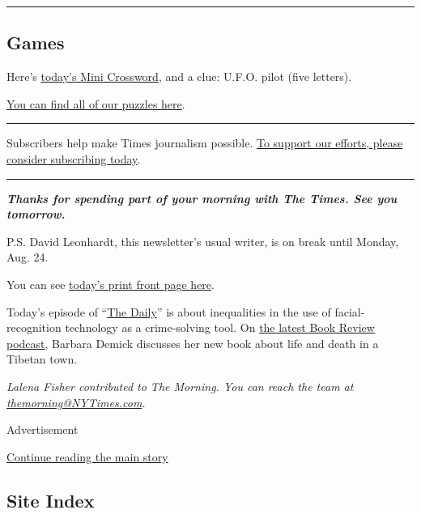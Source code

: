 \begin{center}\rule{0.5\linewidth}{\linethickness}\end{center}

\hypertarget{games}{%
\subsection{Games}\label{games}}

Here's
\href{https://www.nytimes3xbfgragh.onion/crosswords/game/mini}{today's
Mini Crossword}, and a clue: U.F.O. pilot (five letters).

\href{https://www.nytimes3xbfgragh.onion/crosswords}{You can find all of
our puzzles here}.

\begin{center}\rule{0.5\linewidth}{\linethickness}\end{center}

Subscribers help make Times journalism possible.
\href{https://www.nytimes3xbfgragh.onion/subscription?campaignId=98XRW}{To
support our efforts, please consider subscribing today}.

\begin{center}\rule{0.5\linewidth}{\linethickness}\end{center}

\emph{\textbf{Thanks for spending part of your morning with The Times.
See you tomorrow.}}

P.S. David Leonhardt, this newsletter's usual writer, is on break until
Monday, Aug. 24.

You can see
\href{https://static01.graylady3jvrrxbe.onion/images/2020/08/03/nytfrontpage/scan.pdf}{today's
print front page here}.

Today's episode of
``\href{https://www.nytimes3xbfgragh.onion/thedaily}{The Daily}'' is
about inequalities in the use of facial-recognition technology as a
crime-solving tool. On
\href{https://www.nytimes3xbfgragh.onion/2020/07/31/books/review/podcast-twilight-democracy-anne-applebaum-eat-buddha-barbara-demick.html}{the
latest Book Review podcast}, Barbara Demick discusses her new book about
life and death in a Tibetan town.

\emph{Lalena Fisher contributed to The Morning. You can reach the team
at}
\href{mailto:themorning@NYTimes.com}{\emph{themorning@NYTimes.com}}\emph{.}

Advertisement

\protect\hyperlink{after-bottom}{Continue reading the main story}

\hypertarget{site-index}{%
\subsection{Site Index}\label{site-index}}

